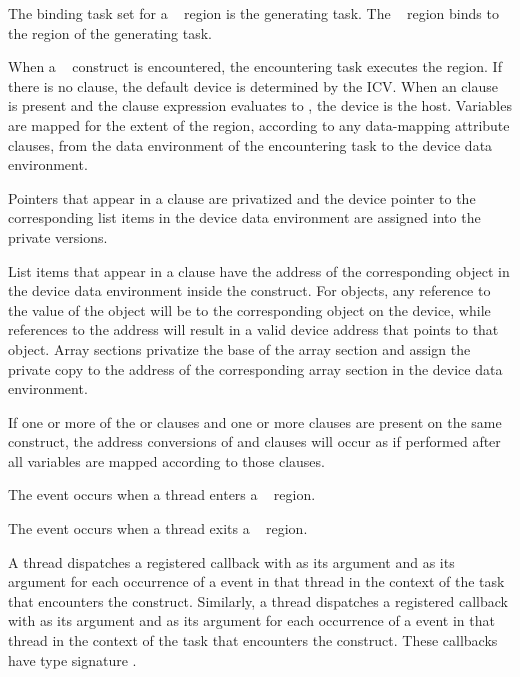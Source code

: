 \binding
The binding task set for a ~ region is the generating task. 
The ~ region binds to the region of the generating task.

\descr
When a ~ construct is encountered, the encountering task
executes the region. If there is no  clause, the default device is
determined by the  ICV. When an  clause is present 
and the  clause expression evaluates to , the device is the host.
Variables are mapped for the extent of the region, according to any data-mapping 
attribute clauses, from the data environment of the encountering task to the 
device data environment.

Pointers that appear in a  clause are privatized and the
device pointer to the corresponding list items in the device data environment
are assigned into the private versions.  

List items that appear in a  clause have the address of
the corresponding object in the device data environment inside the construct.
For objects, any reference to the value of the object will be to the
corresponding object on the device, while references to the address will result
in a valid device address that points to that object.  Array sections privatize the
base of the array section and assign the private copy to the address of the
corresponding array section in the device data environment.  

If one or more of the  or
 clauses and one or more  clauses are present on the
same construct, the address conversions of  and
 clauses will occur as if performed after all variables
are mapped according to those  clauses.

\events

The  event occurs when a thread enters 
a ~ region.

The  event occurs when a thread exits a
~ region.

\tools

A thread dispatches a registered  callback with 
 as its  argument and 
 as its  argument for each occurrence 
of a  event in that thread in the context of the task 
that encounters the construct. Similarly, a thread dispatches a registered 
 callback with  as its 
 argument and  as its  
argument for each occurrence of a  event in that thread 
in the context of the task that encounters the construct. These callbacks have 
type signature . 

